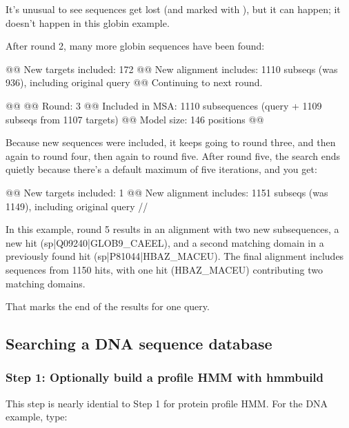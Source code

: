 It's unusual to see sequences get lost (and marked with \ccode{-}),
but it can happen; it doesn't happen in this globin example.

After round 2, many more globin sequences have been found:

\begin{samepage}
\begin{sreoutput}
@@ New targets included:   172
@@ New alignment includes: 1110 subseqs (was 936), including original query
@@ Continuing to next round.

@@
@@ Round:                  3
@@ Included in MSA:        1110 subsequences (query + 1109 subseqs from 1107 targets)
@@ Model size:             146 positions
@@
\end{sreoutput}
\end{samepage}

Because new sequences were included, it keeps going to round three,
and then again to round four, then again to round five. After round
five, the search ends quietly because there's a default maximum
of five iterations, and you get:

\begin{samepage}
\begin{sreoutput}
@@ New targets included:   1
@@ New alignment includes: 1151 subseqs (was 1149), including original query
//
\end{sreoutput}
\end{samepage}

In this example, round 5 results in an alignment with two new subsequences, a
new hit (sp|Q09240|GLOB9\_CAEEL), and a second matching domain in a
previously found hit (sp|P81044|HBAZ\_MACEU). The final alignment includes
sequences from 1150 hits, with one hit (HBAZ\_MACEU) contributing two matching
domains.
 
That \ccode{//} marks the end of the results for one query.




\subsection{Searching a DNA sequence database}

\subsubsection{Step 1: Optionally build a profile HMM with hmmbuild}

This step is nearly idential to Step 1 for protein profile HMM. For the DNA
example, type:

